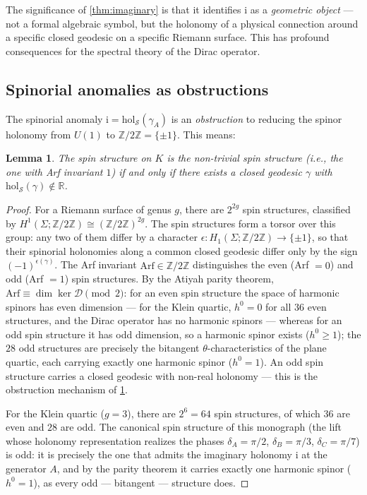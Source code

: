 \documentclass[12pt,a4paper]{article}
\newtheorem{lemma}[theorem]{Lemma}
\theoremstyle{definition}
\theoremstyle{remark}
\newcommand{\RR}{\mathbb{R}}
\newcommand{\ZZ}{\mathbb{Z}}
\newcommand{\hol}{\mathrm{hol}}
\newcommand{\cD}{\mathcal{D}}
\newcommand{\cS}{\mathcal{S}}
\newcommand{\ii}{\mathrm{i}}
\begin{document}
The significance of \cref{thm:imaginary} is that it identifies $\ii$ as a \emph{geometric object} --- not a formal algebraic symbol, but the holonomy of a physical connection around a specific closed geodesic on a specific Riemann surface. This has profound consequences for the spectral theory of the Dirac operator.

\subsection{Spinorial anomalies as obstructions}

The spinorial anomaly $\ii = \hol_{\cS}(\gamma_A)$ is an \emph{obstruction} to reducing the spinor holonomy from $U(1)$ to $\ZZ/2\ZZ = \{\pm 1\}$. This means:

\begin{lemma}
\label{lem:obstruction}
The spin structure on $K$ is the \emph{non-trivial} spin structure (i.e., the one with Arf invariant $1$) if and only if there exists a closed geodesic $\gamma$ with $\hol_{\cS}(\gamma) \notin \RR$.
\end{lemma}

\begin{proof}
For a Riemann surface of genus $g$, there are $2^{2g}$ spin structures, classified by $H^1(\Sigma; \ZZ/2\ZZ) \cong (\ZZ/2\ZZ)^{2g}$. The spin structures form a torsor over this group: any two of them differ by a character $\epsilon \colon H_1(\Sigma; \ZZ/2\ZZ) \to \{\pm 1\}$, so that their spinorial holonomies along a common closed geodesic differ only by the sign $(-1)^{\epsilon(\gamma)}$. The Arf invariant $\mathrm{Arf} \in \ZZ/2\ZZ$ distinguishes the even (Arf $= 0$) and odd (Arf $= 1$) spin structures. By the Atiyah parity theorem, $\mathrm{Arf} \equiv \dim \ker \cD \pmod{2}$: for an even spin structure the space of harmonic spinors has even dimension --- for the Klein quartic, $h^0 = 0$ for all $36$ even structures, and the Dirac operator has no harmonic spinors --- whereas for an odd spin structure it has odd dimension, so a harmonic spinor exists ($h^0 \geq 1$); the $28$ odd structures are precisely the bitangent $\theta$-characteristics of the plane quartic, each carrying exactly one harmonic spinor ($h^0 = 1$). An odd spin structure carries a closed geodesic with non-real holonomy --- this is the obstruction mechanism of \cref{lem:obstruction}.

For the Klein quartic ($g = 3$), there are $2^6 = 64$ spin structures, of which $36$ are even and $28$ are odd. The canonical spin structure of this monograph (the lift whose holonomy representation realizes the phases $\delta_A = \pi/2$, $\delta_B = \pi/3$, $\delta_C = \pi/7$) is odd: it is precisely the one that admits the imaginary holonomy $\ii$ at the generator $A$, and by the parity theorem it carries exactly one harmonic spinor ($h^0 = 1$), as every odd --- bitangent --- structure does.
\end{proof}
\end{document}
